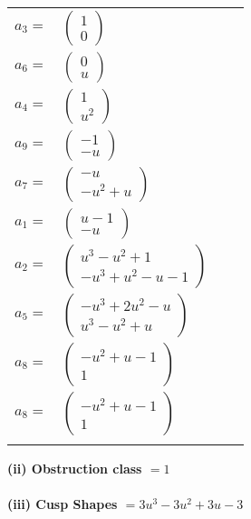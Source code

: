 \documentclass[1p]{elsarticle_modified}
\theoremstyle{definition}
\begin{document}
\begin{tabular}{m{7pt} m{180pt} m{7pt} m{180pt} }
\flushright $a_{3}=$&$\begin{pmatrix}1\\0\end{pmatrix}$ \\
\flushright $a_{6}=$&$\begin{pmatrix}0\\u\end{pmatrix}$ \\
\flushright $a_{4}=$&$\begin{pmatrix}1\\u^2\end{pmatrix}$ \\
\flushright $a_{9}=$&$\begin{pmatrix}-1\\- u\end{pmatrix}$ \\
\flushright $a_{7}=$&$\begin{pmatrix}- u\\- u^2+u\end{pmatrix}$ \\
\flushright $a_{1}=$&$\begin{pmatrix}u-1\\- u\end{pmatrix}$ \\
\flushright $a_{2}=$&$\begin{pmatrix}u^3- u^2+1\\- u^3+u^2- u-1\end{pmatrix}$ \\
\flushright $a_{5}=$&$\begin{pmatrix}- u^3+2 u^2- u\\u^3- u^2+u\end{pmatrix}$ \\
\flushright $a_{8}=$&$\begin{pmatrix}- u^2+u-1\\1\end{pmatrix}$\\ \flushright $a_{8}=$&$\begin{pmatrix}- u^2+u-1\\1\end{pmatrix}$\\&\end{tabular}
\flushleft \textbf{(ii) Obstruction class $= 1$}\\~\\
\flushleft \textbf{(iii) Cusp Shapes $= 3 u^3-3 u^2+3 u-3$}\\~\\
\end{document}
